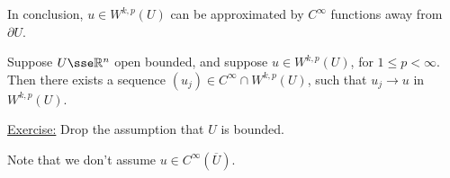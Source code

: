 \documentclass{article}
\begin{document}
In conclusion, \(u \in W^{k, p}(U)\) can be approximated by \(C^\infty\) functions away from \(\partial U\).

\lec

\begin{theorem}
    \label{thm:global-sobolev-approx-away-from-boundary}
    Suppose \(U \sse \R^n\) open bounded, and suppose \(u \in W^{k, p}(U)\), for \(1 \le p < \infty\). Then there exists a sequence \((u_j) \in C^\infty \cap W^{k, p}(U)\), such that \(u_j \to u\) in \(W^{k, p}(U)\).
\end{theorem}

\underline{Exercise:} Drop the assumption that \(U\) is bounded.

\begin{remark}
    Note that we don't assume \(u \in C^\infty(\overline U)\).
\end{remark}
\end{document}
